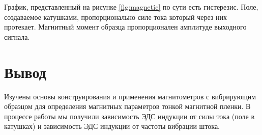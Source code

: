 \documentclass[a4paper, 12pt]{extarticle}
\begin{document}
График, представленный на рисунке \ref{fig:magnetic} по сути есть гистерезис. Поле, создаваемое катушками, пропорционально силе тока который через них протекает. Магнитный момент образца пропорционален амплитуде выходного сигнала.

\section*{\textcolor{header}{Вывод}}


Изучены основы конструирования и применения магнитометров с вибрирующим
образцом для определения магнитных параметров тонкой магнитной пленки. В процессе
работы мы получили зависимость ЭДС индукции от силы тока (поле в катушках) и
зависимость ЭДС индукции от частоты вибрации штока.
\end{document}
